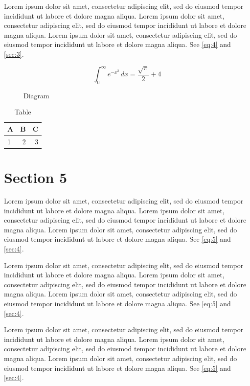 \documentclass[11pt]{article}
\begin{document}
Lorem ipsum dolor sit amet, consectetur adipiscing elit, sed do eiusmod tempor incididunt ut labore et dolore magna aliqua. Lorem ipsum dolor sit amet, consectetur adipiscing elit, sed do eiusmod tempor incididunt ut labore et dolore magna aliqua. Lorem ipsum dolor sit amet, consectetur adipiscing elit, sed do eiusmod tempor incididunt ut labore et dolore magna aliqua. See \cref{eq:4} and \cref{sec:3}.

\begin{equation}\label{eq:4} \int_0^\infty e^{-x^2}\,dx = \frac{\sqrt{\pi}}{2} + 4\end{equation}
\begin{figure}[h]\centering{}\caption{Diagram}\end{figure}
\begin{table}[h]\centering\begin{tabular}{lrr}\toprule A&B&C\\\midrule 1&2&3\\\bottomrule\end{tabular}\caption{Table}\end{table}
\section{Section 5}\label{sec:5}
Lorem ipsum dolor sit amet, consectetur adipiscing elit, sed do eiusmod tempor incididunt ut labore et dolore magna aliqua. Lorem ipsum dolor sit amet, consectetur adipiscing elit, sed do eiusmod tempor incididunt ut labore et dolore magna aliqua. Lorem ipsum dolor sit amet, consectetur adipiscing elit, sed do eiusmod tempor incididunt ut labore et dolore magna aliqua. See \cref{eq:5} and \cref{sec:4}.

Lorem ipsum dolor sit amet, consectetur adipiscing elit, sed do eiusmod tempor incididunt ut labore et dolore magna aliqua. Lorem ipsum dolor sit amet, consectetur adipiscing elit, sed do eiusmod tempor incididunt ut labore et dolore magna aliqua. Lorem ipsum dolor sit amet, consectetur adipiscing elit, sed do eiusmod tempor incididunt ut labore et dolore magna aliqua. See \cref{eq:5} and \cref{sec:4}.

Lorem ipsum dolor sit amet, consectetur adipiscing elit, sed do eiusmod tempor incididunt ut labore et dolore magna aliqua. Lorem ipsum dolor sit amet, consectetur adipiscing elit, sed do eiusmod tempor incididunt ut labore et dolore magna aliqua. Lorem ipsum dolor sit amet, consectetur adipiscing elit, sed do eiusmod tempor incididunt ut labore et dolore magna aliqua. See \cref{eq:5} and \cref{sec:4}.
\end{document}
